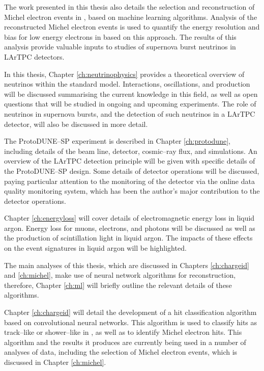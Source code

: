 The work presented in this thesis also details the selection and 
reconstruction of Michel electron events in \protodune{}, based on machine 
learning algorithms. Analysis of the reconstructed Michel electron events is 
used to quantify the energy resolution and bias for low energy electrons in 
\protodune{} based on this approach. The results of this analysis provide 
valuable inputs to studies of supernova burst neutrinos in LArTPC detectors.

In this thesis, Chapter \ref{ch:neutrinophysics} provides a theoretical 
overview of neutrinos within the standard model. Interactions, oscillations, 
and production will be discussed summarising the current knowledge in this
field, as well as open questions that will be studied in ongoing and upcoming 
experiments. The role of neutrinos in supernova bursts, and the detection of 
such neutrinos in a LArTPC detector, will also be discussed in more detail.

The ProtoDUNE--SP experiment is described in Chapter \ref{ch:protodune},
including details of the beam line, detector, cosmic--ray flux, and simulations.
An overview of the LArTPC detection principle will be given with specific
details of the ProtoDUNE--SP design. Some details of detector operations will be
discussed, paying particular attention to the monitoring of the detector via the
online data quality monitoring system, which has been the author's major 
contribution to the detector operations.

Chapter \ref{ch:energyloss} will cover details of electromagnetic energy loss
in liquid argon. Energy loss for muons, electrons, and photons will be discussed
as well as the production of scintillation light in liquid argon. The impacts 
of these effects on the event signatures in liquid argon will be highlighted.

The main analyses of this thesis, which are discussed in Chapters 
\ref{ch:chargeid} and \ref{ch:michel}, make use of neural network algorithms 
for reconstruction, therefore, Chapter \ref{ch:ml} will briefly outline the 
relevant details of these algorithms.

Chapter \ref{ch:chargeid} will detail the development of a hit classification
algorithm based on convolutional neural networks. This algorithm is used to
classify hits as track--like or shower--like in \protodune{}, as well as to 
identify Michel electron hits. This algorithm and the results it produces are 
currently being used in a number of analyses of \protodune{} data, including 
the selection of Michel electron events, which is discussed in Chapter 
\ref{ch:michel}.

